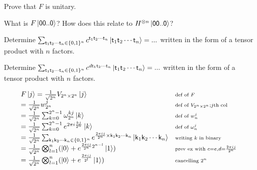 \begin{example}
Prove that $F$ is unitary.
\end{example}

\begin{example}
What is $F\left|\textsf{00..0}\right\rangle$? How does this relate to $H^{\otimes n}\left|\textsf{00..0}\right\rangle$?
\end{example}



\begin{example}
Determine $\sum_{\textsf{t}_1 \textsf{t}_2 \dotsm \textsf{t}_n \in \{0,1\}^n} 
c^{\textsf{t}_1 \textsf{t}_2 \dotsm \textsf{t}_n} 
\left|\textsf{t}_1 \textsf{t}_2 \dotsm \textsf{t}_n\right\rangle = ...$ 
written in the form of a tensor product with $n$ factors.
\end{example}



\begin{example}
Determine $\sum_{\textsf{t}_1 \textsf{t}_2 \dotsm \textsf{t}_n \in \{0,1\}^n} 
c^{d \textsf{t}_1 \textsf{t}_2 \dotsm \textsf{t}_n} 
\left|\textsf{t}_1 \textsf{t}_2 \dotsm \textsf{t}_n\right\rangle = ...$ 
written in the form of a tensor product with $n$ factors.
\end{example}



\frmrule

\[ 
\begin{array}{l >{\scriptstyle}l}
F\ket{j} = \frac{1}{\sqrt{2^n}} V_{2^n \times 2^n} \ket{j} & \text{def of } F  \\
         = \frac{1}{\sqrt{2^n}} w^{j}_{2^n} & \text{def of } V_{2^n \times 2^n}; j\text{th col} \\
         = \frac{1}{\sqrt{2^n}} \sum^{2^n-1}_{k=0} \omega^{kj}_{2^n} \ket{k} & \text{def of } w^{j}_{n}\\
         = \frac{1}{\sqrt{2^n}} \sum^{2^n-1}_{k=0} e^{2\pi i\frac{kj}{2^n}} \ket{k} & \text{def of } \omega^{j}_{n} \\
         = \frac{1}{\sqrt{2^n}} \sum_{\textsf{k}_1 \textsf{k}_2 \dotsm \textsf{k}_n \in \{0,1\}^n} 
                   e^{\frac{2 \pi ij}{2^n} \times \textsf{k}_1 \textsf{k}_2 \dotsm \textsf{k}_n} 
                   \ket{\textsf{k}_1 \textsf{k}_2 \dotsm \textsf{k}_n} & \text{writing }k\text{ in binary} \\
		= \frac{1}{\sqrt{2^n}} \bigotimes^n_{l=1} (\ket{0} + e^{\frac{2\pi i j}{2^n} 2^{n-l}} \ket{1})
		& \text{prev ex with } c = e, d = \frac{2\pi i j}{2^n} \\
		= \frac{1}{\sqrt{2^n}} \bigotimes^n_{l=1} (\ket{0} + e^{\frac{2\pi i j}{2^l}} \ket{1})
		 & \text{cancelling }2^n 
\end{array}
\]



